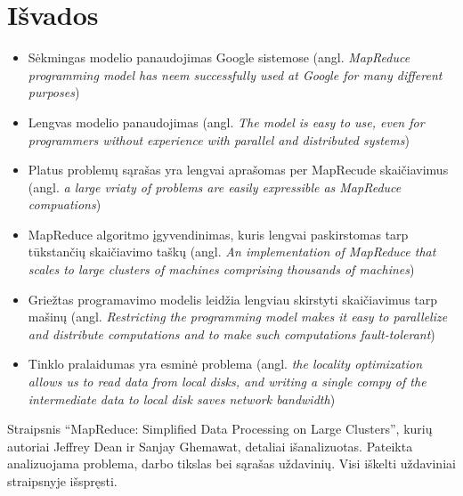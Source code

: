 \documentclass[10pt, onecolumn]{IEEEtran}
\begin{document}
	\section{Išvados}

		\begin{itemize}
	      \item Sėkmingas modelio panaudojimas Google sistemose (angl. \textit{MapReduce programming model has neem successfully used at Google for many different purposes})
	      \item Lengvas modelio panaudojimas (angl. \textit{The model is easy to use, even for programmers without experience with parallel and distributed systems})
	      \item Platus problemų sąrašas yra lengvai aprašomas per MapRecude skaičiavimus (angl. \textit{a large vriaty of problems are easily expressible as MapReduce compuations})
	      \item MapReduce algoritmo įgyvendinimas, kuris lengvai paskirstomas tarp tūkstančių skaičiavimo taškų (angl. \textit{An implementation of MapReduce that scales to large clusters of machines comprising thousands of machines})
	      \item Griežtas programavimo modelis leidžia lengviau skirstyti skaičiavimus tarp mašinų (angl. \textit{Restricting the programming model makes it easy to parallelize and distribute computations and to make such computations fault-tolerant})
	      \item Tinklo pralaidumas yra esminė problema (angl. \textit{the locality optimization allows us to read data from local disks, and writing a single compy of the intermediate data to local disk saves network bandwidth})
	    \end{itemize}

		Straipsnis ``MapReduce: Simplified Data Processing on Large Clusters'', kurių autoriai Jeffrey Dean ir Sanjay Ghemawat, detaliai išanalizuotas. Pateikta analizuojama problema, darbo tikslas bei sąrašas uždavinių. Visi iškelti uždaviniai straipsnyje išspręsti. 
\end{document}
